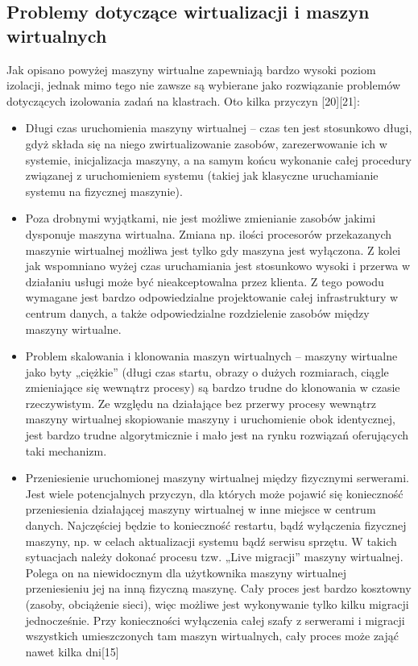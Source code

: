 \documentclass[10pt,a4paper,titlepage,twoside]{report}
\begin{document}
\subsection{Problemy dotyczące wirtualizacji i maszyn wirtualnych}\indent \indent Jak opisano powyżej maszyny wirtualne zapewniają bardzo wysoki poziom izolacji, jednak mimo tego nie zawsze są wybierane jako rozwiązanie problemów dotyczących izolowania zadań na klastrach. Oto kilka przyczyn [20][21]:
\begin{itemize}
	\item Długi czas uruchomienia maszyny wirtualnej – czas ten jest stosunkowo długi, gdyż składa się na niego zwirtualizowanie zasobów, zarezerwowanie ich w systemie, inicjalizacja maszyny, a na samym końcu wykonanie całej procedury związanej z uruchomieniem systemu (takiej jak klasyczne uruchamianie systemu na fizycznej maszynie). 
	\item Poza drobnymi wyjątkami, nie jest możliwe zmienianie zasobów jakimi dysponuje maszyna wirtualna. Zmiana np. ilości procesorów przekazanych maszynie wirtualnej możliwa jest tylko gdy maszyna jest wyłączona. Z kolei jak wspomniano wyżej czas uruchamiania jest stosunkowo wysoki i przerwa w działaniu usługi może być nieakceptowalna przez klienta. Z tego powodu wymagane jest bardzo odpowiedzialne projektowanie całej infrastruktury w centrum danych, a także odpowiedzialne rozdzielenie zasobów między maszyny wirtualne.
	\item Problem skalowania i klonowania maszyn wirtualnych – maszyny wirtualne jako byty „ciężkie” (długi czas startu, obrazy o dużych rozmiarach, ciągle zmieniające się wewnątrz procesy) są bardzo trudne do klonowania w czasie rzeczywistym. Ze względu na działające bez przerwy procesy wewnątrz maszyny wirtualnej skopiowanie maszyny i uruchomienie obok identycznej, jest bardzo trudne algorytmicznie i mało jest na rynku rozwiązań oferujących taki mechanizm.
	\item Przeniesienie uruchomionej maszyny wirtualnej między fizycznymi serwerami. Jest wiele potencjalnych przyczyn, dla których może pojawić się konieczność przeniesienia działającej maszyny wirtualnej w inne miejsce w centrum danych. Najczęściej będzie to konieczność restartu, bądź wyłączenia fizycznej maszyny, np. w celach aktualizacji systemu bądź serwisu sprzętu. W takich sytuacjach należy dokonać procesu tzw. „Live migracji” maszyny wirtualnej. Polega on na niewidocznym dla użytkownika maszyny wirtualnej przeniesieniu jej na inną fizyczną maszynę. Cały proces jest bardzo kosztowny (zasoby, obciążenie sieci), więc możliwe jest wykonywanie tylko kilku migracji jednocześnie. Przy konieczności wyłączenia całej szafy z serwerami i migracji wszystkich umieszczonych tam maszyn wirtualnych, cały proces może zająć nawet kilka dni[15]
\end{itemize}
\end{document}
